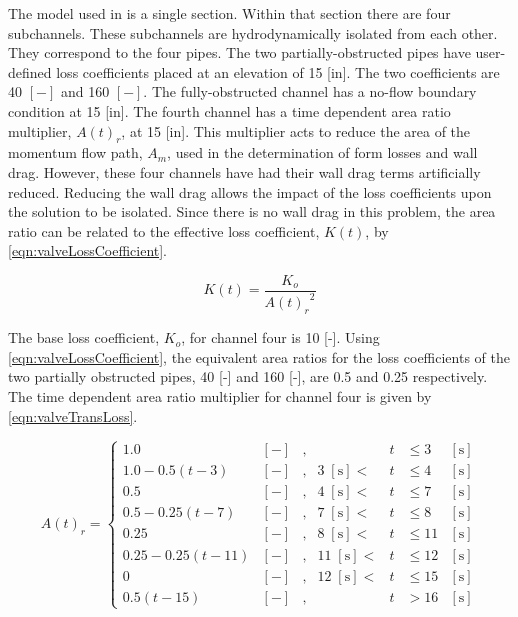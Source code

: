 The model used in \cobra{} is a single section.
Within that section there are four subchannels.
These subchannels are hydrodynamically isolated from each other.
They correspond to the four pipes.
The two partially-obstructed pipes have user-defined loss coefficients placed at an elevation of 15 [in].
The two coefficients are 40 $[-]$ and 160 $[-]$.
The fully-obstructed channel has a no-flow boundary condition at 15 [in].
The fourth channel has a time dependent area ratio multiplier, $A(t)_r$, at 15 [in].
This multiplier acts to reduce the area of the momentum flow path, $A_m$, used in the determination of form losses and wall drag.
However, these four channels have had their wall drag terms artificially reduced.
Reducing the wall drag allows the impact of the loss coefficients upon the solution to be isolated.
Since there is no wall drag in this problem, the area ratio can be related to the effective loss coefficient, $K(t)$, by \eqref{eqn:valveLossCoefficient}.

\begin{equation}
\label{eqn:valveLossCoefficient}
K(t) = \frac{K_{o}}{{A(t)_r}^2}
\end{equation}

The base loss coefficient, $K_o$, for channel four is 10 [-].
Using \eqref{eqn:valveLossCoefficient}, the equivalent area ratios for the loss coefficients of the two partially obstructed pipes, 40 [-] and 160 [-], are 0.5 and 0.25 respectively.
The time dependent area ratio multiplier for channel four is given by \eqref{eqn:valveTransLoss}.

\begin{equation}
\label{eqn:valveTransLoss}
A(t)_{r} = \left\{
\begin{array}{cclrcll}
 1.0 & [-] & , & & t & \leq 3 & [\text{s}] \\
 1.0 - 0.5 \left( t - 3\right) & [-] & , & 3\; [\text{s}] < & t & \leq 4 & [\text{s}] \\
 0.5 & [-] & , & 4\; [\text{s}] < & t & \leq 7 & [\text{s}] \\
 0.5 - 0.25 \left( t - 7\right) & [-] & , &  7\; [\text{s}] < & t & \leq 8 & [\text{s}] \\
 0.25 & [-] & , & 8\; [\text{s}] < & t & \leq 11 & [\text{s}] \\
 0.25 - 0.25 \left( t - 11\right) & [-] & , & 11\; [\text{s}] < & t & \leq 12 & [\text{s}] \\
 0 & [-] & , & 12\; [\text{s}] < & t & \leq 15 & [\text{s}] \\
 0.5 \left( t - 15\right) & [-] & , & & t & > 16 & [\text{s}]
\end{array}\right.
\end{equation}

